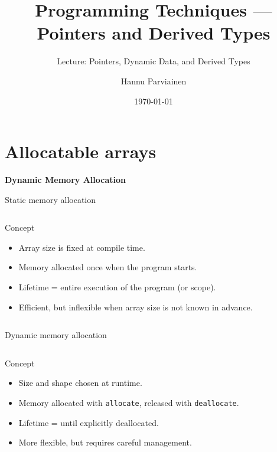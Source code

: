 

\usepackage{tikz}
\usetikzlibrary{positioning}

\title{Programming Techniques --- Pointers and Derived Types}
\subtitle{Lecture: Pointers, Dynamic Data, and Derived Types}
\author{Hannu Parviainen}
\date{\today}



\begin{frame}
  \titlepage
\end{frame}

\section{Allocatable arrays}

\begin{frame}
	\centering
	\Huge \textbf{Dynamic Memory Allocation}
\end{frame}


\begin{frame}[fragile]{Static memory allocation}
  \begin{columns}[T]
    \begin{block}{Concept}
      \begin{itemize}
        \item Array size is fixed at compile time.
        \item Memory allocated once when the program starts.
        \item Lifetime = entire execution of the program (or scope).
        \item Efficient, but inflexible when array size is not known in advance.
      \end{itemize}
    \end{block}
    
  \end{columns}
\end{frame}


\begin{frame}[fragile]{Dynamic memory allocation}
  \begin{columns}[T]
    \begin{block}{Concept}
      \begin{itemize}
        \item Size and shape chosen at runtime.
        \item Memory allocated with \texttt{allocate}, released with \texttt{deallocate}.
        \item Lifetime = until explicitly deallocated.
        \item More flexible, but requires careful management.
      \end{itemize}
    \end{block}
    
  \end{columns}
\end{frame}


